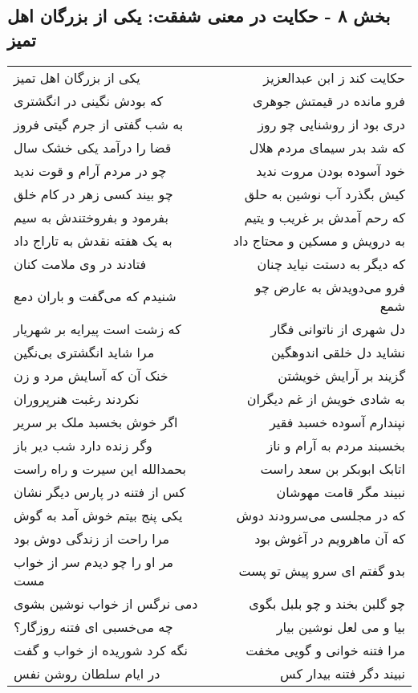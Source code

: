 \begin{center}
\section*{بخش ۸ - حکایت در معنی شفقت: یکی از بزرگان اهل تمیز}
\label{sec:008}
\begin{longtable}{l p{0.5cm} r}
یکی از بزرگان اهل تمیز
&&
حکایت کند ز ابن عبدالعزیز
\\
که بودش نگینی در انگشتری
&&
فرو مانده در قیمتش جوهری
\\
به شب گفتی از جرم گیتی فروز
&&
دری بود از روشنایی چو روز
\\
قضا را درآمد یکی خشک سال
&&
که شد بدر سیمای مردم هلال
\\
چو در مردم آرام و قوت ندید
&&
خود آسوده بودن مروت ندید
\\
چو بیند کسی زهر در کام خلق
&&
کیش بگذرد آب نوشین به حلق
\\
بفرمود و بفروختندش به سیم
&&
که رحم آمدش بر غریب و یتیم
\\
به یک هفته نقدش به تاراج داد
&&
به درویش و مسکین و محتاج داد
\\
فتادند در وی ملامت کنان
&&
که دیگر به دستت نیاید چنان
\\
شنیدم که می‌گفت و باران دمع
&&
فرو می‌دویدش به عارض چو شمع
\\
که زشت است پیرایه بر شهریار
&&
دل شهری از ناتوانی فگار
\\
مرا شاید انگشتری بی‌نگین
&&
نشاید دل خلقی اندوهگین
\\
خنک آن که آسایش مرد و زن
&&
گزیند بر آرایش خویشتن
\\
نکردند رغبت هنرپروران
&&
به شادی خویش از غم دیگران
\\
اگر خوش بخسبد ملک بر سریر
&&
نپندارم آسوده خسبد فقیر
\\
وگر زنده دارد شب دیر باز
&&
بخسبند مردم به آرام و ناز
\\
بحمدالله این سیرت و راه راست
&&
اتابک ابوبکر بن سعد راست
\\
کس از فتنه در پارس دیگر نشان
&&
نبیند مگر قامت مهوشان
\\
یکی پنج بیتم خوش آمد به گوش
&&
که در مجلسی می‌سرودند دوش
\\
مرا راحت از زندگی دوش بود
&&
که آن ماهرویم در آغوش بود
\\
مر او را چو دیدم سر از خواب مست
&&
بدو گفتم ای سرو پیش تو پست
\\
دمی نرگس از خواب نوشین بشوی
&&
چو گلبن بخند و چو بلبل بگوی
\\
چه می‌خسبی ای فتنه روزگار؟
&&
بیا و می لعل نوشین بیار
\\
نگه کرد شوریده از خواب و گفت
&&
مرا فتنه خوانی و گویی مخفت
\\
در ایام سلطان روشن نفس
&&
نبیند دگر فتنه بیدار کس
\\
\end{longtable}
\end{center}
